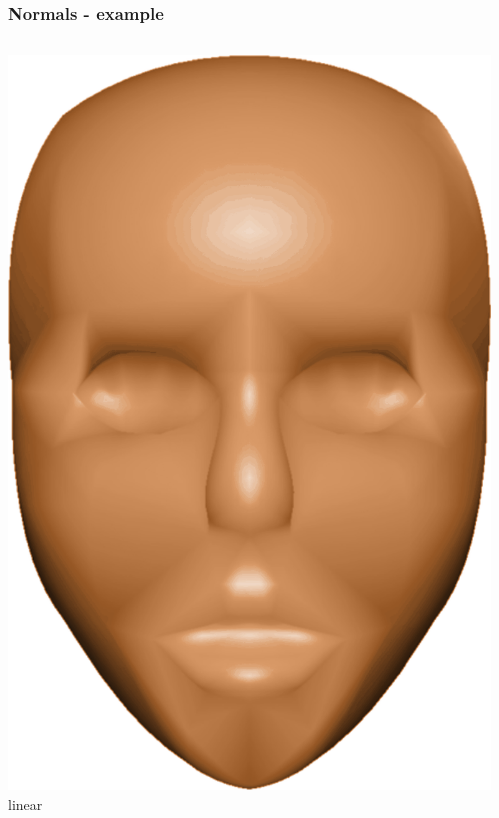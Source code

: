 	\begin{frame}\frametitle{Normals - example}
		\begin{columns}
			\begin{column}{0.4\textwidth}
			\begin{center}
					\includegraphics[width=\textwidth]{img/1_single/linearlyVaryingNormals.png}
					\small{linear}
				\end{center}	
			\end{column}
			\begin{column}{0.4\textwidth}
			\begin{center}

\end{center}
\end{column}
\end{columns}
\end{frame}
